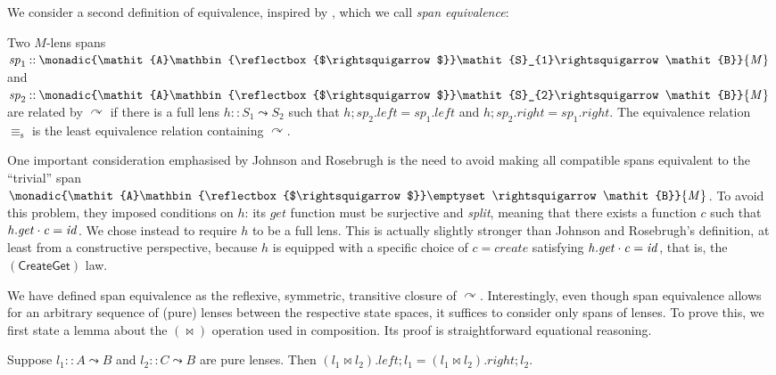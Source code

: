 \documentclass[runningheads]{llncs}
\newcommand{\Conid}[1]{\mathit{#1}}
\newcommand{\Varid}[1]{\mathit{#1}}
\begin{document}
We consider a second definition of equivalence, inspired by \citet{johnson14bx}, which we call \emph{span equivalence}:
\begin{definition}
   Two \ensuremath{\Conid{M}}-lens spans \ensuremath{\Varid{sp}_{\mathrm{1}}\mathbin{::}\monadic{\Conid{A}\mathbin{\reflectbox{$\rightsquigarrow$}}\Conid{S}_{1}\rightsquigarrow\Conid{B}}{\Conid{M}}}
  and \ensuremath{\Varid{sp}_{\mathrm{2}}\mathbin{::}\monadic{\Conid{A}\mathbin{\reflectbox{$\rightsquigarrow$}}\Conid{S}_{2}\rightsquigarrow\Conid{B}}{\Conid{M}}} are related by \ensuremath{\curvearrowright } if
  there is a full lens \ensuremath{\Varid{h}\mathbin{::}\Conid{S}_{1}\mathbin{\leadsto}\Conid{S}_{2}} such that \ensuremath{\Varid{h}\mathbin{;}\Varid{sp}_{\mathrm{2}}\mathord{.}\Varid{left}\mathrel{=}\Varid{sp}_{\mathrm{1}}\mathord{.}\Varid{left}} and \ensuremath{\Varid{h}\mathbin{;}\Varid{sp}_{\mathrm{2}}\mathord{.}\Varid{right}\mathrel{=}\Varid{sp}_{\mathrm{1}}\mathord{.}\Varid{right}}.  The
  equivalence relation \ensuremath{\equiv_{\mathrm{s}} } is the least equivalence relation
  containing \ensuremath{\curvearrowright }.
\end{definition}
One important consideration emphasised by Johnson and Rosebrugh is
the need to avoid making all compatible spans equivalent to the
``trivial'' span \ensuremath{\monadic{\Conid{A}\mathbin{\reflectbox{$\rightsquigarrow$}}\emptyset\rightsquigarrow\Conid{B}}{\Conid{M}}}.
To avoid this problem, they imposed conditions on \ensuremath{\Varid{h}}:
its \ensuremath{\Varid{get}} function must be surjective and \emph{split}, meaning that
there exists a function \ensuremath{\Varid{c}} such that \ensuremath{\Varid{h}\mathord{.}\Varid{get}\hsdot{\mathbin{\cdot}}{\mathrel{.}}\Varid{c}\mathrel{=}\Varid{id}}.  We chose
instead to require \ensuremath{\Varid{h}} to be a full lens.  This is actually slightly
stronger than Johnson and Rosebrugh's definition, at least from a
constructive perspective, because \ensuremath{\Varid{h}} is equipped with a specific
choice of \ensuremath{\Varid{c}\mathrel{=}\Varid{create}} satisfying \ensuremath{\Varid{h}\mathord{.}\Varid{get}\hsdot{\mathbin{\cdot}}{\mathrel{.}}\Varid{c}\mathrel{=}\Varid{id}}, that is, the
\ensuremath{\mathsf{(CreateGet)}} law.


We have defined span equivalence as the reflexive, symmetric,
transitive closure of \ensuremath{\curvearrowright }.  Interestingly, even though span
equivalence allows for an arbitrary sequence of (pure) lenses between the
respective state spaces, it suffices to consider only spans of
lenses.  To prove this, we first state a lemma about the
\ensuremath{({\Join})} operation used in composition.  Its proof is
straightforward equational reasoning.
\begin{lemma}\label{lem:cospan2span-pullback}
  Suppose \ensuremath{\Varid{l}_{1}\mathbin{::}\Conid{A}\mathbin{\leadsto}\Conid{B}} and \ensuremath{\Varid{l}_{2}\mathbin{::}\Conid{C}\mathbin{\leadsto}\Conid{B}} are pure lenses.  Then \ensuremath{(\Varid{l}_{1}\mathbin{\Join}\Varid{l}_{2})\mathord{.}\Varid{left}\mathbin{;}\Varid{l}_{1}\mathrel{=}(\Varid{l}_{1}\mathbin{\Join}\Varid{l}_{2})\mathord{.}\Varid{right}\mathbin{;}\Varid{l}_{2}}.
\end{lemma}
\end{document}
